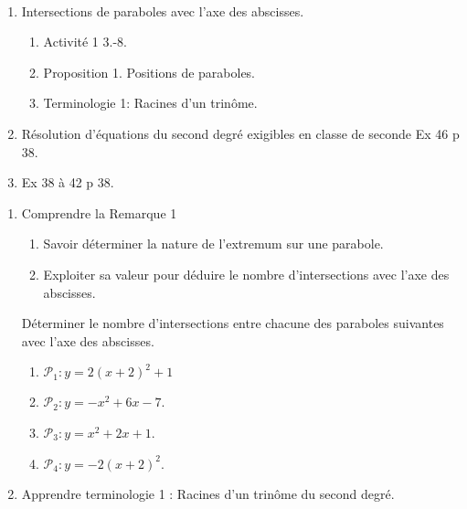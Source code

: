 \documentclass[a4paper,11pt]{article}
\title{}
\author{}
\date{}
\theoremstyle{break}
\newcounter{numero}
\newcommand{\exo}{
  \addtocounter{numero}{1}%
  \textbf{\underline{Exercice \arabic{numero}:}}\quad}
\begin{document}
  \setlength{\unitlength}{1mm}
  \setlength\parindent{0mm}
  
  
  ~
  \medskip
  
  \begin{enumerate}
   
   \item Intersections de paraboles avec l'axe des abscisses.
   \begin{enumerate}
    \item Activité 1 3.-8.
    \item Proposition 1. Positions de paraboles.
    \item Terminologie 1: Racines d'un trinôme.
   \end{enumerate}
   \item Résolution d'équations du second degré exigibles en classe de seconde Ex 46 p 38.
   \item Ex 38 à 42 p 38.
  \end{enumerate}
  
 \begin{enumerate}
  
  
  \item Comprendre la Remarque 1
  \begin{enumerate}
     \item Savoir déterminer la nature de l'extremum sur une parabole.
     \item Exploiter sa valeur pour déduire le nombre d'intersections 
     avec l'axe des abscisses.
  \end{enumerate}
  \vspace{0.5cm}
  \begin{dm}
    
    Déterminer le nombre d'intersections entre chacune des paraboles suivantes
    avec l'axe des abscisses.
    \begin{enumerate}
      \item $\mathcal{P}_1:y=2(x+2)^2+1$
      \item $\mathcal{P}_2:y=-x^2+6x-7$.%
      \item $\mathcal{P}_3:y=x^2+2x+1$.
      \item $\mathcal{P}_4:y=-2(x+2)^2$.
    \end{enumerate} 
  \end{dm}

 \item Apprendre terminologie 1 : Racines d'un trinôme du second degré.
  \end{enumerate}
\end{document}
